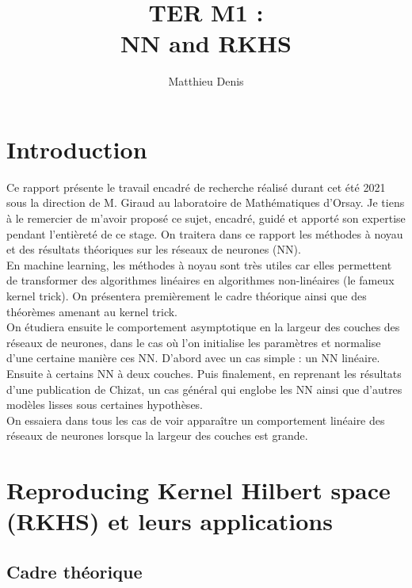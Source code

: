 \documentclass[a4paper, 11pt, french]{article}
\title{TER M1 : \\ NN and RKHS}
\author{Matthieu Denis}
\theoremstyle{definition}
\begin{document}
	
	\maketitle
	\newpage
	
	\tableofcontents
	\newpage
	
	\section{Introduction}
	
	Ce rapport présente le travail encadré de recherche réalisé durant cet été 2021 sous la direction de M. Giraud au laboratoire de Mathématiques d'Orsay. Je tiens à le remercier de m'avoir proposé ce sujet, encadré, guidé et apporté son expertise pendant l'entièreté de ce stage. On traitera dans ce rapport les méthodes à noyau et des résultats théoriques sur les réseaux de neurones (NN). \\
	
	En machine learning, les méthodes à noyau sont très utiles car elles permettent de transformer des algorithmes linéaires en algorithmes non-linéaires (le fameux kernel trick). On présentera premièrement le cadre théorique ainsi que des théorèmes amenant au kernel trick. \\
	
	On étudiera ensuite le comportement asymptotique en la largeur des couches des réseaux de neurones, dans le cas où l'on initialise les paramètres et normalise d'une certaine manière ces NN. D'abord avec un cas simple : un NN linéaire. Ensuite à certains NN à deux couches. Puis finalement, en reprenant les résultats d'une publication de Chizat, un cas général qui englobe les NN ainsi que d'autres modèles lisses sous certaines hypothèses.  \\
	
	On essaiera dans tous les cas de voir apparaître un comportement linéaire des réseaux de neurones lorsque la largeur des couches est grande.
	
	\newpage
	
	\section{Reproducing Kernel Hilbert space (RKHS) et leurs applications}
	
	\subsection{Cadre théorique}
	
\end{document}
